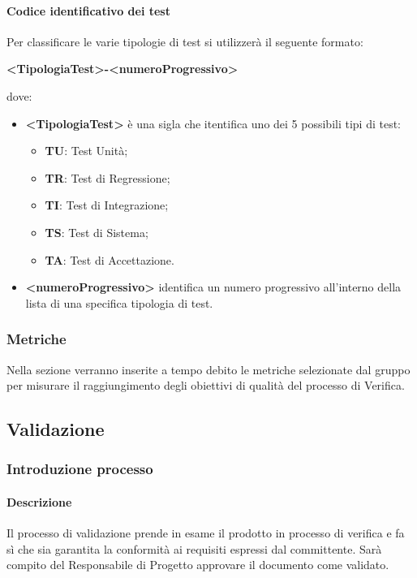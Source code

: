 				\paragraph{Codice identificativo dei test}
					Per classificare le varie tipologie di test si utilizzerà il seguente formato:
					\begin{center}
						\textbf{<TipologiaTest>-<numeroProgressivo>}
					\end{center}
					dove:
					\begin{itemize}
						\item\textbf{<TipologiaTest> } è una sigla che itentifica uno dei 5 possibili tipi di test:
							\begin{itemize}
								\item\textbf{TU}: Test Unità;
								\item\textbf{TR}: Test di Regressione;
								\item\textbf{TI}: Test di Integrazione;
								\item\textbf{TS}: Test di Sistema;
								\item\textbf{TA}: Test di Accettazione.
							\end{itemize}
						\item\textbf{<numeroProgressivo>} identifica un numero progressivo all’interno della lista di una specifica tipologia di test.
					\end{itemize}
		\subsubsection{Metriche}
			Nella sezione verranno inserite a tempo debito le metriche selezionate dal gruppo per misurare il raggiungimento degli obiettivi di qualità del processo di Verifica.

	\subsection{Validazione}
		\subsubsection{Introduzione processo}
			\paragraph{Descrizione}
				Il processo di validazione prende in esame il prodotto in processo di verifica e fa sì che sia garantita la conformità ai requisiti espressi dal committente. Sarà compito del Responsabile di Progetto approvare il documento come validato.
